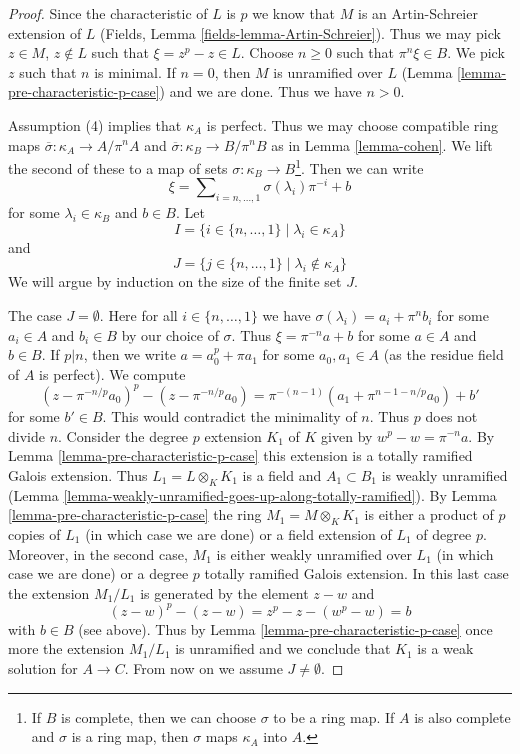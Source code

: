 \begin{proof}
Since the characteristic of $L$ is $p$ we know that $M$ is an Artin-Schreier
extension of $L$ (Fields, Lemma \ref{fields-lemma-Artin-Schreier}).
Thus we may pick $z \in M$, $z \not \in L$ such that
$\xi = z^p - z \in L$. Choose $n \geq 0$ such that $\pi^n\xi \in B$.
We pick $z$ such that $n$ is minimal. If $n = 0$, then $M$ is unramified
over $L$ (Lemma \ref{lemma-pre-characteristic-p-case}) and we are done.
Thus we have $n > 0$.

\medskip\noindent
Assumption (4) implies that $\kappa_A$ is perfect. Thus we may
choose compatible ring maps $\overline{\sigma} : \kappa_A \to A/\pi^n A$ and
$\overline{\sigma} : \kappa_B \to B/\pi^n B$ as in
Lemma \ref{lemma-cohen}. We lift the second of these to a
map of sets $\sigma : \kappa_B \to B$\footnote{If $B$ is complete, then
we can choose $\sigma$ to be a ring map. If $A$ is also complete and
$\sigma$ is a ring map, then $\sigma$ maps $\kappa_A$ into $A$.}.
Then we can write
$$
\xi = \sum\nolimits_{i = n, \ldots, 1} \sigma(\lambda_i) \pi^{-i} + b
$$
for some $\lambda_i \in \kappa_B$ and $b \in B$. Let
$$
I = \{i \in \{n, \ldots, 1\} \mid \lambda_i \in \kappa_A\}
$$
and
$$
J = \{j \in \{n, \ldots, 1\} \mid \lambda_i \not \in \kappa_A\}
$$
We will argue by induction on the size of the finite set $J$.

\medskip\noindent
The case $J = \emptyset$. Here for all $i \in \{n, \ldots, 1\}$ we have
$\sigma(\lambda_i) = a_i + \pi^n b_i$ for some $a_i \in A$ and $b_i \in B$
by our choice of $\sigma$. Thus
$\xi = \pi^{-n} a + b$ for some $a \in A$ and $b \in B$.
If $p | n$, then we write $a = a_0^p + \pi a_1$ for some $a_0, a_1 \in A$
(as the residue field of $A$ is perfect). We compute
$$
(z - \pi^{-n/p}a_0)^p - (z - \pi^{-n/p}a_0) =
\pi^{-(n - 1)}(a_1 + \pi^{n - 1 - n/p}a_0) + b'
$$
for some $b' \in B$. This would contradict the minimality of $n$. Thus $p$
does not divide $n$. Consider the degree $p$ extension $K_1$ of $K$ given
by $w^p - w = \pi^{-n}a$. By
Lemma \ref{lemma-pre-characteristic-p-case}
this extension is a totally ramified Galois extension.
Thus $L_1 = L \otimes_K K_1$ is a field and $A_1 \subset B_1$
is weakly unramified
(Lemma \ref{lemma-weakly-unramified-goes-up-along-totally-ramified}).
By Lemma \ref{lemma-pre-characteristic-p-case}
the ring $M_1 = M \otimes_K K_1$ is either a product of $p$ copies
of $L_1$ (in which case we are done) or a field extension of $L_1$
of degree $p$. Moreover, in the second case, $M_1$ is either weakly unramified
over $L_1$ (in which case we are done) or a degree $p$ totally
ramified Galois extension. In this last case the extension $M_1/L_1$
is generated by the element $z - w$ and
$$
(z - w)^p - (z - w) = z^p - z - (w^p - w) = b
$$
with $b \in B$ (see above). Thus by Lemma \ref{lemma-pre-characteristic-p-case}
once more the extension $M_1/L_1$ is unramified and we conclude
that $K_1$ is a weak solution for $A \to C$.
From now on we assume $J \not = \emptyset$.


\end{proof}
